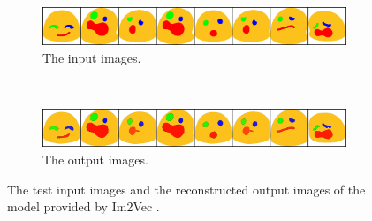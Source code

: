 \begin{figure}
    \centering
    \begin{subfigure}{\textwidth}
        \includegraphics[width=\textwidth]{graphics/work-artifacts/im2vec/110/real_img_VectorVAEnLayers_0406.png}
        \caption{The input images.}
    \end{subfigure} \\
    \begin{subfigure}{\textwidth}
        \includegraphics[width=\textwidth]{graphics/work-artifacts/im2vec/110/recons_VectorVAEnLayers_0406.png}
        \caption{The output images.}
    \end{subfigure}
    \caption{The test input images and the reconstructed output images of the model provided by Im2Vec \citep{DBLP:conf/cvpr/Reddy21}.}
    \label{fig:110.recons}
\end{figure}

